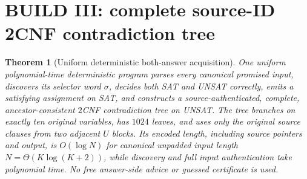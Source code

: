 \documentclass[11pt]{article}
\newtheorem{theorem}{Theorem}
\begin{document}
\section{BUILD III: complete source-ID 2CNF contradiction tree}
\begin{theorem}[Uniform deterministic both-answer acquisition]\label{thm:cert}
One uniform polynomial-time deterministic program parses every canonical promised input, discovers its selector word $\sigma$, decides both SAT and UNSAT correctly, emits a satisfying assignment on SAT, and constructs a source-authenticated, complete, ancestor-consistent $2$CNF contradiction tree on UNSAT. The tree branches on exactly ten original variables, has $1024$ leaves, and uses only the original source clauses from two adjacent $U$ blocks. Its encoded length, including source pointers and output, is $O(\log N)$ for canonical unpadded input length $N=\Theta(K\log(K+2))$, while discovery and full input authentication take polynomial time. No free answer-side advice or guessed certificate is used.
\end{theorem}
\end{document}
